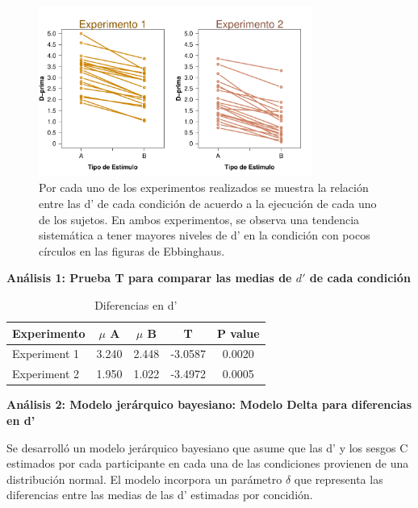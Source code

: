\begin{figure}[th]
\centering
\includegraphics[width=0.80\textwidth]{Figures/Diff_D_E1yE2}
\caption[Diferencias en Discriminabilidad (Verificando que las condiciones sean, de hecho, diferentes)]{Por cada uno de los experimentos realizados se muestra la relación entre las d' de cada condición de acuerdo a la ejecución de cada uno de los sujetos. En ambos experimentos, se observa una tendencia sistemática a tener mayores niveles de d' en la condición con pocos círculos en las figuras de Ebbinghaus.}
\label{fig:Diff_D}
\end{figure}

\textbf{Análisis 1: Prueba T para comparar las medias de $d'$ de cada condición}

\begin{table}
\caption[Prueba T para evaluar diferencias en las medias de d' entre las condiciones]{Diferencias en d'}
\label{Tabla_t-HitsyFA}
\centering
\begin{tabular}{l | c c c c}
\toprule
\textbf{Experimento} & \textbf{$\mu$ A} & \textbf{$\mu$ B} & \textbf{T}  & \textbf{P value}\\
\midrule
Experiment 1 & 3.240 & 2.448 & -3.0587 & 0.0020 \\
Experiment 2 & 1.950 & 1.022 & -3.4972 & 0.0005 \\
\bottomrule
\end{tabular}
\end{table}


\textbf{Análisis 2: Modelo jerárquico bayesiano: Modelo Delta para diferencias en d'}

Se desarrolló un modelo jerárquico bayesiano que asume que las d' y los sesgos C estimados por cada participante en cada una de las condiciones provienen de una distribución normal. El modelo incorpora un parámetro $\delta$ que representa las diferencias entre las medias de las d' estimadas por concidión.

